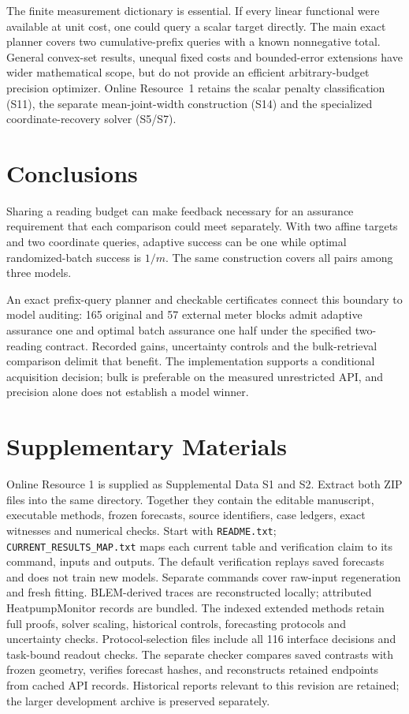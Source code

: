 \documentclass[12pt]{article}
\begin{document}
The finite measurement dictionary is essential. If every linear functional
were available at unit cost, one could query a scalar target directly.
The main exact planner covers two cumulative-prefix queries with a known
nonnegative total. General convex-set results, unequal fixed costs and
bounded-error extensions have wider mathematical scope, but do not provide
an efficient arbitrary-budget precision optimizer. Online Resource~1 retains
the scalar penalty classification (S11), the separate mean-joint-width
construction (S14) and the specialized coordinate-recovery solver (S5/S7).

\section{Conclusions}
Sharing a reading budget can make feedback necessary for an assurance
requirement that each comparison could meet separately. With two affine
targets and two coordinate queries, adaptive success can be one while
optimal randomized-batch success is $1/m$. The same construction covers
all pairs among three models.

An exact prefix-query planner and checkable certificates connect this
boundary to model auditing: 165 original and 57 external meter blocks admit
adaptive assurance one and optimal batch assurance one half under the
specified two-reading contract. Recorded gains, uncertainty controls and
the bulk-retrieval comparison delimit that benefit. The implementation
supports a conditional acquisition decision; bulk is preferable on the
measured unrestricted API, and precision alone does not establish a model
winner.
\section*{Supplementary Materials}
Online Resource 1 is supplied as Supplemental Data S1 and S2. Extract both
ZIP files into the same directory. Together they contain the editable
manuscript, executable methods, frozen forecasts, source identifiers, case
ledgers, exact witnesses and numerical checks. Start with \texttt{README.txt};
\texttt{CURRENT\_RESULTS\_MAP.txt} maps each current table and verification
claim to its command, inputs and outputs. The default verification replays
saved forecasts and does not train new models. Separate commands cover
raw-input regeneration and fresh fitting. BLEM-derived traces are reconstructed
locally; attributed HeatpumpMonitor records are bundled. The indexed extended
methods retain full proofs, solver scaling, historical controls, forecasting
protocols and uncertainty checks. Protocol-selection files include all 116
interface decisions and task-bound readout checks. The separate checker
compares saved contrasts with frozen geometry, verifies forecast hashes,
and reconstructs retained endpoints from cached API records. Historical
reports relevant to this revision are retained; the larger development
archive is preserved separately.
\end{document}
